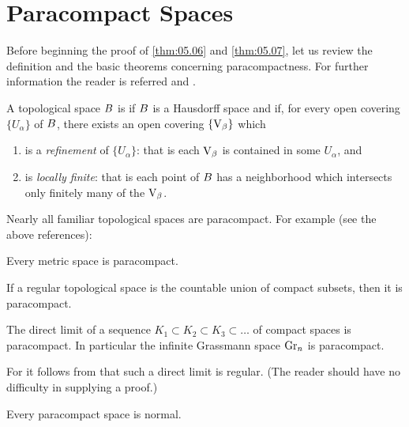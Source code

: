 \documentclass[../main]{subfiles}
\begin{document}
\section{ Paracompact Spaces} \label{sec:5.3}
Before beginning the proof of \ref{thm:05.06} and \ref{thm:05.07}, let us review the definition and the basic theorems concerning paracompactness. For further information the reader is referred  \cite{kelley1955} and \cite{dugundji1966}. 

\begin{definition}
A topological space $B$ is  if $B$ is a Hausdorff space and if, for every open covering $\{U_\alpha\}$ of $B$, there exists an open covering $\{\operatorname{V}_\beta\}$ which

\begin{enumerate}[label=\arabic*)]
    \item is a \emph{refinement} of $\{U_\alpha\}$: that is each $\operatorname{V}_\beta$ is contained in some $U_\alpha$, and
    \item is \emph{locally finite}: that is each point of $B$ has a neighborhood which intersects only finitely many of the $\operatorname{V}_\beta$. 
\end{enumerate}
\end{definition}

Nearly all familiar topological spaces are paracompact. For example (see the above references):
\begin{theorem*}[A. H. Stone]\label{thm:5.8}
Every metric space is paracompact.
\end{theorem*}
\begin{theorem*}[Morita]\label{thm:05.09}
If a regular topological space is the countable union of compact subsets, then it is paracompact.
\end{theorem*}

\begin{corollary*}
The direct limit of a sequence $K_1 \subset K_2 \subset K_3 \subset \ldots$ of compact spaces is paracompact. In particular the infinite Grassmann space $\operatorname{Gr}_n$ is paracompact. 
\end{corollary*}

For it follows from \cite[\S 18.3]{whitehead1961} that such a direct limit is regular. (The reader should have no difficulty in supplying a proof.)
\begin{theorem*}[Dieudonné]
Every paracompact space is normal.
\end{theorem*}
\end{document}
